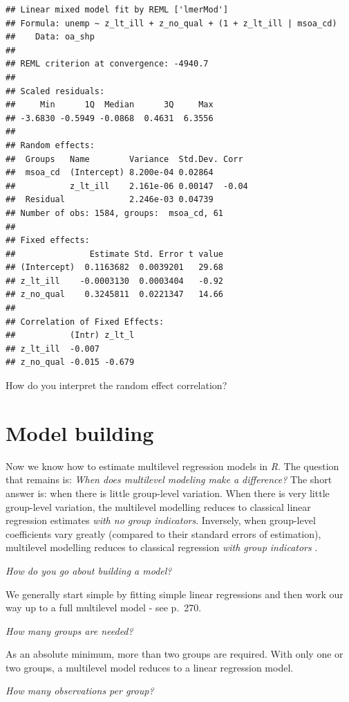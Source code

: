 \documentclass[
]{book}
\begin{document}
\begin{verbatim}
## Linear mixed model fit by REML ['lmerMod']
## Formula: unemp ~ z_lt_ill + z_no_qual + (1 + z_lt_ill | msoa_cd)
##    Data: oa_shp
## 
## REML criterion at convergence: -4940.7
## 
## Scaled residuals: 
##     Min      1Q  Median      3Q     Max 
## -3.6830 -0.5949 -0.0868  0.4631  6.3556 
## 
## Random effects:
##  Groups   Name        Variance  Std.Dev. Corr 
##  msoa_cd  (Intercept) 8.200e-04 0.02864       
##           z_lt_ill    2.161e-06 0.00147  -0.04
##  Residual             2.246e-03 0.04739       
## Number of obs: 1584, groups:  msoa_cd, 61
## 
## Fixed effects:
##               Estimate Std. Error t value
## (Intercept)  0.1163682  0.0039201   29.68
## z_lt_ill    -0.0003130  0.0003404   -0.92
## z_no_qual    0.3245811  0.0221347   14.66
## 
## Correlation of Fixed Effects:
##           (Intr) z_lt_l
## z_lt_ill  -0.007       
## z_no_qual -0.015 -0.679
\end{verbatim}

How do you interpret the random effect correlation?

\hypertarget{model-building}{%
\section{Model building}\label{model-building}}

Now we know how to estimate multilevel regression models in \emph{R}. The question that remains is: \emph{When does multilevel modeling make a difference?} The short answer is: when there is little group-level variation. When there is very little group-level variation, the multilevel modelling reduces to classical linear regression estimates \emph{with no group indicators}. Inversely, when group-level coefficients vary greatly (compared to their standard errors of estimation), multilevel modelling reduces to classical regression \emph{with group indicators} \citet{Gelman_Hill_2006_book}.

\emph{How do you go about building a model?}

We generally start simple by fitting simple linear regressions and then work our way up to a full multilevel model - see \citet{Gelman_Hill_2006_book} p.~270.

\emph{How many groups are needed?}

As an absolute minimum, more than two groups are required. With only one or two groups, a multilevel model reduces to a linear regression model.

\emph{How many observations per group?}
\end{document}

